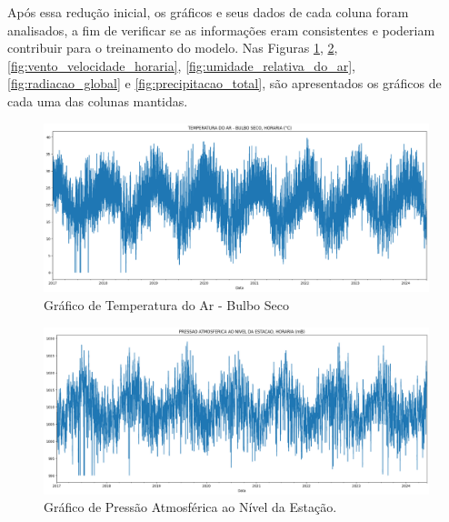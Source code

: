 Após essa redução inicial, os gráficos e seus dados de cada coluna foram analisados, a fim de verificar se as informações eram consistentes e poderiam contribuir para o treinamento do modelo. Nas Figuras \ref{fig:temperatura_do_ar_bulbo_seco}, \ref{fig:pressao_atmosferica_ao_nivel_da_estacao}, \ref{fig:vento_velocidade_horaria}, \ref{fig:umidade_relativa_do_ar}, \ref{fig:radiacao_global} e \ref{fig:precipitacao_total}, são apresentados os gráficos de cada uma das colunas mantidas.

\begin{figure}[H]
	\caption{\label{fig:temperatura_do_ar_bulbo_seco}Gráfico de Temperatura do Ar - Bulbo Seco}
	\begin{center}
		\includegraphics[scale=0.35]{figuras/temperatura_do_ar_bulbo_seco.png}
	\end{center}
\end{figure}

\begin{figure}[H]
	\caption{\label{fig:pressao_atmosferica_ao_nivel_da_estacao}Gráfico de Pressão Atmosférica ao Nível da Estação.}
	\begin{center}
		\includegraphics[scale=0.35]{figuras/pressao_atmosferica_ao_nivel_da_estacao.png}
	\end{center}
\end{figure}

